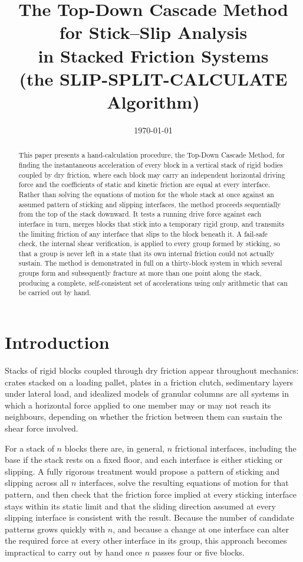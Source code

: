 \documentclass[11pt,a4paper]{article}
\title{\textbf{The Top-Down Cascade Method for Stick--Slip Analysis\\ in Stacked Friction Systems}\\[4pt]
\large (the SLIP-SPLIT-CALCULATE Algorithm)}
\date{\today}
\begin{document}
\maketitle

\begin{abstract}
This paper presents a hand-calculation procedure, the Top-Down Cascade Method, for finding the instantaneous acceleration of every block in a vertical stack of rigid bodies coupled by dry friction, where each block may carry an independent horizontal driving force and the coefficients of static and kinetic friction are equal at every interface. Rather than solving the equations of motion for the whole stack at once against an assumed pattern of sticking and slipping interfaces, the method proceeds sequentially from the top of the stack downward. It tests a running drive force against each interface in turn, merges blocks that stick into a temporary rigid group, and transmits the limiting friction of any interface that slips to the block beneath it. A fail-safe check, the internal shear verification, is applied to every group formed by sticking, so that a group is never left in a state that its own internal friction could not actually sustain. The method is demonstrated in full on a thirty-block system in which several groups form and subsequently fracture at more than one point along the stack, producing a complete, self-consistent set of accelerations using only arithmetic that can be carried out by hand.
\end{abstract}

\tableofcontents

\section{Introduction}

Stacks of rigid blocks coupled through dry friction appear throughout mechanics: crates stacked on a loading pallet, plates in a friction clutch, sedimentary layers under lateral load, and idealized models of granular columns are all systems in which a horizontal force applied to one member may or may not reach its neighbours, depending on whether the friction between them can sustain the shear force involved.

For a stack of $n$ blocks there are, in general, $n$ frictional interfaces, including the base if the stack rests on a fixed floor, and each interface is either sticking or slipping. A fully rigorous treatment would propose a pattern of sticking and slipping across all $n$ interfaces, solve the resulting equations of motion for that pattern, and then check that the friction force implied at every sticking interface stays within its static limit and that the sliding direction assumed at every slipping interface is consistent with the result. Because the number of candidate patterns grows quickly with $n$, and because a change at one interface can alter the required force at every other interface in its group, this approach becomes impractical to carry out by hand once $n$ passes four or five blocks.
\end{document}
